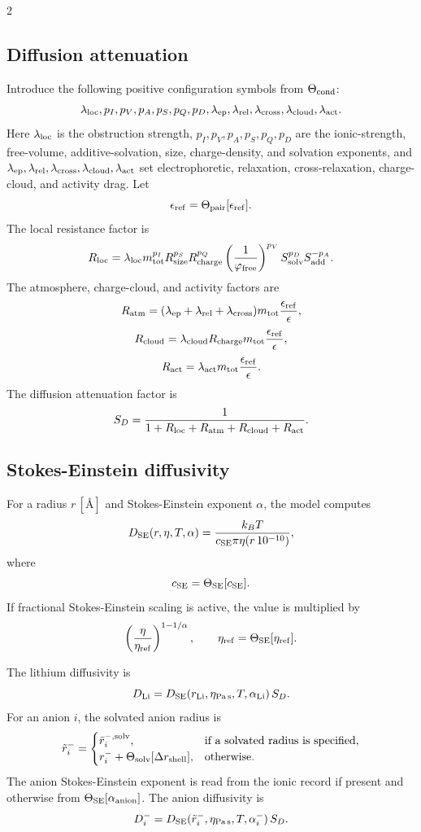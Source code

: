 \documentclass[10pt]{article}
\newcommand{\Ang}{\text{\AA}}
\begin{document}
\begin{multicols}{2}
\subsection{Diffusion attenuation}

Introduce the following positive configuration symbols from \(\Theta_{\rm cond}\):
\[
\begin{gathered}
\lambda_{\rm loc}, p_I,p_V,p_A,p_S,p_Q,p_D,
\lambda_{\rm ep},\lambda_{\rm rel},\lambda_{\rm cross},
\lambda_{\rm cloud},\lambda_{\rm act}.
\end{gathered}
\]
Here \(\lambda_{\rm loc}\) is the obstruction strength, \(p_I,p_V,p_A,p_S,p_Q,p_D\)
are the ionic-strength, free-volume, additive-solvation, size,
charge-density, and solvation exponents, and
\(\lambda_{\rm ep},\lambda_{\rm rel},\lambda_{\rm cross},\lambda_{\rm cloud},
\lambda_{\rm act}\) set electrophoretic, relaxation, cross-relaxation,
charge-cloud, and activity drag.
Let
\[
\epsilon_{\rm ref}=\Theta_{\rm pair}[\epsilon_{\rm ref}].
\]
The local resistance factor is
\[
R_{\rm loc}
=
\lambda_{\rm loc}
m_{\rm tot}^{p_I}
R_{\rm size}^{p_S}
R_{\rm charge}^{p_Q}
\left(\frac{1}{\varphi_{\rm free}}\right)^{p_V}
S_{\rm solv}^{p_D}
S_{\rm add}^{-p_A}.
\]
The atmosphere, charge-cloud, and activity factors are
\[
R_{\rm atm}
=
(\lambda_{\rm ep}+\lambda_{\rm rel}+\lambda_{\rm cross})
m_{\rm tot}\frac{\epsilon_{\rm ref}}{\epsilon},
\]
\[
R_{\rm cloud}
=
\lambda_{\rm cloud}
R_{\rm charge}
m_{\rm tot}\frac{\epsilon_{\rm ref}}{\epsilon},
\]
\[
R_{\rm act}
=
\lambda_{\rm act}
m_{\rm tot}\frac{\epsilon_{\rm ref}}{\epsilon}.
\]
The diffusion attenuation factor is
\[
S_D
=
\frac{1}{1+R_{\rm loc}+R_{\rm atm}+R_{\rm cloud}+R_{\rm act}}.
\]

\subsection{Stokes-Einstein diffusivity}

For a radius \(r\,[\Ang]\) and Stokes-Einstein exponent \(\alpha\), the model
computes
\[
D_{\rm SE}(r,\eta,T,\alpha)
=
\frac{k_B T}
{c_{\rm SE}\pi\eta(r\,10^{-10})},
\]
where
\[
c_{\rm SE}=\Theta_{\rm SE}[c_{\rm SE}].
\]
If fractional Stokes-Einstein scaling is active, the value is multiplied by
\[
\left(\frac{\eta}{\eta_{\rm ref}}\right)^{1-1/\alpha},
\qquad
\eta_{\rm ref}=\Theta_{\rm SE}[\eta_{\rm ref}].
\]

The lithium diffusivity is
\[
D_{\rm Li}=D_{\rm SE}(r_{\rm Li},\eta_{\rm Pa\,s},T,\alpha_{\rm Li})\,S_D.
\]
For an anion \(i\), the solvated anion radius is
\[
\tilde r^-_i =
\begin{cases}
\bar r_i^{-,{\rm solv}}, & \text{if a solvated radius is specified},\\
r^-_i+\Theta_{\rm solv}[\Delta r_{\rm shell}], & \text{otherwise}.
\end{cases}
\]
The anion Stokes-Einstein exponent is read from the ionic record if present
and otherwise from
\(\Theta_{\rm SE}[\alpha_{\rm anion}]\). The anion diffusivity is
\[
D^-_i=D_{\rm SE}(\tilde r^-_i,\eta_{\rm Pa\,s},T,\alpha^-_i)\,S_D.
\]


\end{multicols}
\end{document}
